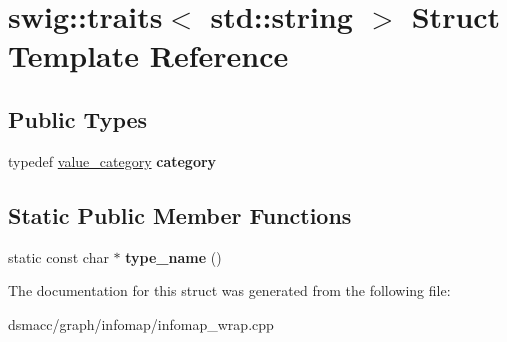 \hypertarget{structswig_1_1traits_3_01std_1_1string_01_4}{}\section{swig\+:\+:traits$<$ std\+:\+:string $>$ Struct Template Reference}
\label{structswig_1_1traits_3_01std_1_1string_01_4}
\subsection*{Public Types}
\begin{DoxyCompactItemize}
\item 
\mbox{\label{structswig_1_1traits_3_01std_1_1string_01_4_aec31e973b1220342e0b89c6b8fe96684}} 
typedef \mbox{\hyperlink{structswig_1_1value__category}{value\+\_\+category}} {\bfseries category}
\end{DoxyCompactItemize}
\subsection*{Static Public Member Functions}
\begin{DoxyCompactItemize}
\item 
\mbox{\label{structswig_1_1traits_3_01std_1_1string_01_4_ab4142e71b21ccbad9a8161a116f660d2}} 
static const char $\ast$ {\bfseries type\+\_\+name} ()
\end{DoxyCompactItemize}


The documentation for this struct was generated from the following file\+:\begin{DoxyCompactItemize}
\item 
dsmacc/graph/infomap/infomap\+\_\+wrap.\+cpp\end{DoxyCompactItemize}
